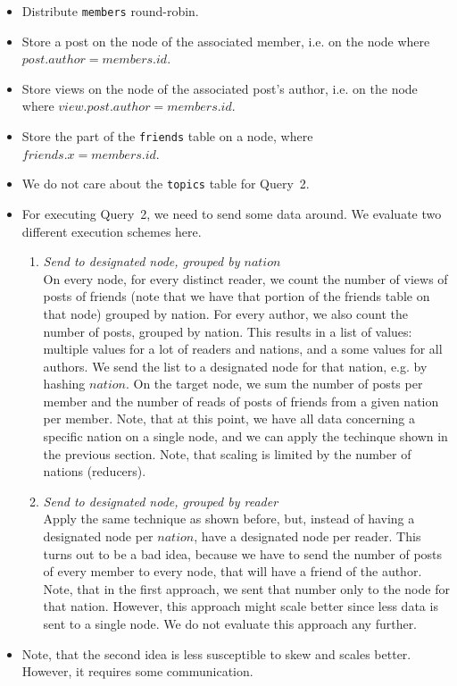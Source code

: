 \documentclass[12pt]{article}
\begin{document}
\begin{itemize}
	\item Distribute \lstinline{members} round-robin.
    \item Store a post on the node of the associated member, i.e. on the node where $\mathit{post.author} = \mathit{members.id}$.
    \item Store views on the node of the associated post's author, i.e. on the node where $\mathit{view.post.author} = \mathit{members.id}$.
    \item Store the part of the \lstinline{friends} table on a node, where $\mathit{friends.x} = \mathit{members.id}$.
    \item We do not care about the \lstinline{topics} table for Query~2.
    \item For executing Query~2, we need to send some data around. We evaluate two different execution schemes here.
    \begin{enumerate}
    	\item \emph{Send to designated node, grouped by $\mathit{nation}$} \\
        On every node, for every distinct reader, we count the number of views of posts of friends (note that we have that portion of the friends table on that node) grouped by nation. For every author, we also count the number of posts, grouped by nation. This results in a list of values: multiple values for a lot of readers and nations, and a some values for all authors. We send the list to a designated node for that nation, e.g. by hashing $\mathit{nation}$. On the target node, we sum the number of posts per member and the number of reads of posts of friends from a given nation per member. Note, that at this point, we have all data concerning a specific nation on a single node, and we can apply the techinque shown in the previous section. Note, that scaling is limited by the number of nations (reducers).
        \item \emph{Send to designated node, grouped by reader} \\ Apply the same technique as shown before, but, instead of having a designated node per $\mathit{nation}$, have a designated node per reader. This turns out to be a bad idea, because we have to send the number of posts of every member to every node, that will have a friend of the author. Note, that in the first approach, we sent that number only to the node for that nation. However, this approach might scale better since less data is sent to a single node. We do not evaluate this approach any further.
    \end{enumerate}
    \item Note, that the second idea is less susceptible to skew and scales better. However, it requires some communication.
\end{itemize}
\end{document}
